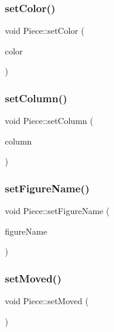 \mbox{\label{class_piece_a5b8c0f65eb850c91ae148501cd15adbf}} 
\subsubsection{\texorpdfstring{set\+Color()}{setColor()}}
{\footnotesize\ttfamily void Piece\+::set\+Color (\begin{DoxyParamCaption}\item[{\hyperlink{_piece_8h_ad7595c48bb74c0dd2a7648712a2d4985}{Piece\+Color}}]{color }\end{DoxyParamCaption})}

\mbox{\label{class_piece_a826ba56a44a5bf2e1ecdea849f2581d3}} 
\subsubsection{\texorpdfstring{set\+Column()}{setColumn()}}
{\footnotesize\ttfamily void Piece\+::set\+Column (\begin{DoxyParamCaption}\item[{int}]{column }\end{DoxyParamCaption})}

\mbox{\label{class_piece_a16971e1511ab403ede566b4fdbbab8a8}} 
\subsubsection{\texorpdfstring{set\+Figure\+Name()}{setFigureName()}}
{\footnotesize\ttfamily void Piece\+::set\+Figure\+Name (\begin{DoxyParamCaption}\item[{std\+::string}]{figure\+Name }\end{DoxyParamCaption})}

\mbox{\label{class_piece_a0ff1ca92370da533f6ef421dc09741f8}} 
\subsubsection{\texorpdfstring{set\+Moved()}{setMoved()}}
{\footnotesize\ttfamily void Piece\+::set\+Moved (\begin{DoxyParamCaption}{ }\end{DoxyParamCaption})}

